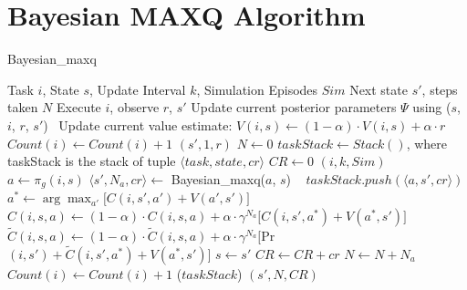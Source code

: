 \section{Bayesian MAXQ Algorithm}
\label{sec:algo}
\begin{algorithm}[t]
\caption{{\sc Bayesian\_maxq}} \label{alg:bmaxq}
\begin{algorithmic}[1]
\REQUIRE Task $i$, State $s$, Update Interval $k$, Simulation Episodes $Sim$
\ENSURE Next state $s'$, steps taken $N$
\STATE Execute $i$, observe $r$, $s'$
\STATE Update current posterior parameters $\Psi$ using ($s$, $i$, $r$, $s'$)~\label{line:update}
\STATE Update current value estimate: $V(i,s) \leftarrow (1-\alpha)\cdot V(i,s)+\alpha\cdot r$
\STATE $Count(i) \leftarrow Count(i)+1$
\RETURN $(s', 1, r)$
\ELSE 
\STATE $N \leftarrow 0$ 
\STATE $taskStack \leftarrow Stack()$, where taskStack is the stack of tuple $\langle task, state, cr \rangle$ %
\STATE $CR \leftarrow 0$
$(i, k, Sim)$
\STATE $a\leftarrow \pi_{g}(i, s)$ 
\STATE $\langle s', N_a, cr\rangle \leftarrow$ {\sc Bayesian\_maxq}($a$, $s$) ~\label{line:recursive}
\STATE $taskStack.push(\langle a, s', cr \rangle)$    
\STATE $a^*\leftarrow \arg\max_{a'}\bigl[C(i,s',a')+V(a',s')\bigr]$ ~\label{line:comp1}
\STATE $C(i,s,a)\leftarrow(1-\alpha)\cdot C(i,s,a) + \alpha\cdot \gamma^{N_a}\bigl[C(i,s',a^*)+V(a^*,s') \bigr]$~\label{line:comp2}
\STATE $\tilde{C}(i,s,a)\leftarrow(1-\alpha)\cdot \tilde{C}(i,s,a) + \alpha\cdot \gamma^{N_a}\bigl[${\sc Pr}$(i, s')+\tilde{C}(i,s',a^*)+V(a^*,s') \bigr]$
\STATE $s\leftarrow s'$
\STATE $CR \leftarrow CR+cr$
\STATE $N\leftarrow N+N_a$
\STATE $Count(i) \leftarrow Count(i)+1$
\ENDWHILE
{}($taskStack$)
\RETURN $(s', N, CR)$
\ENDIF
\end{algorithmic}
\end{algorithm} 

